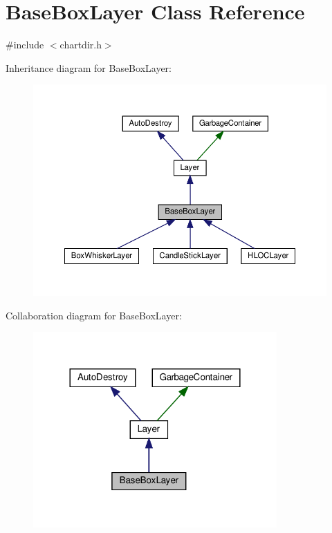 \hypertarget{class_base_box_layer}{}\section{Base\+Box\+Layer Class Reference}
\label{class_base_box_layer}


{\ttfamily \#include $<$chartdir.\+h$>$}



Inheritance diagram for Base\+Box\+Layer\+:
\nopagebreak
\begin{figure}[H]
\begin{center}
\leavevmode
\includegraphics[width=350pt]{class_base_box_layer__inherit__graph}
\end{center}
\end{figure}


Collaboration diagram for Base\+Box\+Layer\+:
\nopagebreak
\begin{figure}[H]
\begin{center}
\leavevmode
\includegraphics[width=264pt]{class_base_box_layer__coll__graph}
\end{center}
\end{figure}
